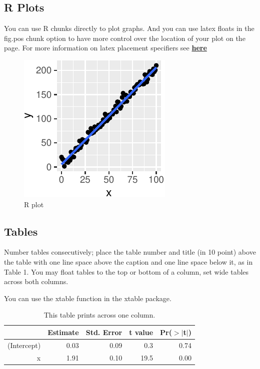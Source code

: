 \documentclass[10pt, letterpaper]{article}
\newenvironment{CodeChunk}{}{}
\begin{document}
\hypertarget{r-plots}{%
\subsection{R Plots}\label{r-plots}}

You can use R chunks directly to plot graphs. And you can use latex
floats in the fig.pos chunk option to have more control over the
location of your plot on the page. For more information on latex
placement specifiers see
\textbf{\href{https://en.wikibooks.org/wiki/LaTeX/Floats,_Figures_and_Captions}{here}}

\begin{CodeChunk}
\begin{figure}[H]

{\centering \includegraphics{figs/plot-1} 

}

\caption[R plot]{R plot}\label{fig:plot}
\end{figure}
\end{CodeChunk}

\hypertarget{tables}{%
\subsection{Tables}\label{tables}}

Number tables consecutively; place the table number and title (in 10
point) above the table with one line space above the caption and one
line space below it, as in Table 1. You may float tables to the top or
bottom of a column, set wide tables across both columns.

You can use the xtable function in the xtable package.

\begin{table}[H]
\centering
\begin{tabular}{rrrrr}
  \hline
 & Estimate & Std. Error & t value & Pr($>$$|$t$|$) \\ 
  \hline
(Intercept) & 0.03 & 0.09 & 0.3 & 0.74 \\ 
  x & 1.91 & 0.10 & 19.5 & 0.00 \\ 
   \hline
\end{tabular}
\caption{This table prints across one column.} 
\end{table}
\end{document}
